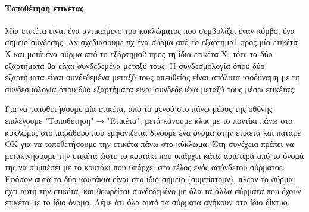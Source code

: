\documentclass[a4paper]{article}
\begin{document}
\begin{figure}
  \begin{center}
    \label{fig:kicad-main}
  \end{center}
\end{figure}

\paragraph{Τοποθέτηση ετικέτας}
Μία ετικέτα είναι ένα αντικείμενο του κυκλώματος που συμβολίζει έναν κόμβο, ένα σημείο σύνδεσης. Αν σχεδιάσουμε πχ ένα σύρμα από το εξάρτημα1 προς μία ετικέτα Χ και μετά ένα σύρμα από το εξάρτημα2 προς τη ίδια ετικέτα Χ, τότε τα δύο εξαρτήματα θα είναι συνδεδεμένα μεταξύ τους. Η συνδεσμολογία όπου δύο εξαρτήματα είναι συνδεδεμένα μεταξύ τους απευθείας είναι απόλυτα ισοδύναμη με τη συνδεσμολογία όπου δύο εξαρτήματα είναι συνδεδεμένα μεταξύ τους μέσω ετικέτας.

Για να τοποθετήσουμε μία ετικέτα, από το μενού στο πάνω μέρος της οθόνης επιλέγουμε "Τοποθέτηση"$\rightarrow$"Ετικέτα", μετά κάνουμε κλικ με το ποντίκι πάνω στο κύκλωμα, στο παράθυρο που εμφανίζεται δίνουμε ένα όνομα στην ετικέτα και πατάμε ΟΚ για να τοποθετήσουμε την ετικέτα πάνω στο κύκλωμα. Στη συνέχεια πρέπει να μετακινήσουμε την ετικέτα ώστε το κουτάκι που υπάρχει κάτω αριστερά από το όνομά της να συμπέσει με το κουτάκι που υπάρχει στο τέλος ενός ασύνδετου σύρματος. Εφόσον αυτά τα δύο κουτάκια είναι στο ίδιο σημείο (συμπίπτουν), πλέον το σύρμα έχει αυτή την ετικέτα, και θεωρείται συνδεδεμένο με όλα τα άλλα σύρματα που έχουν ετικέτα με το ίδιο όνομα. Λέμε ότι όλα αυτά τα σύρματα ανήκουν στο ίδιο δίκτυο.

\begin{figure}
  \begin{center}
    \label{fig:kicad-main}
  \end{center}
\end{figure}

\begin{figure}
  \begin{center}
    \label{fig:kicad-main}
  \end{center}
\end{figure}
\end{document}
